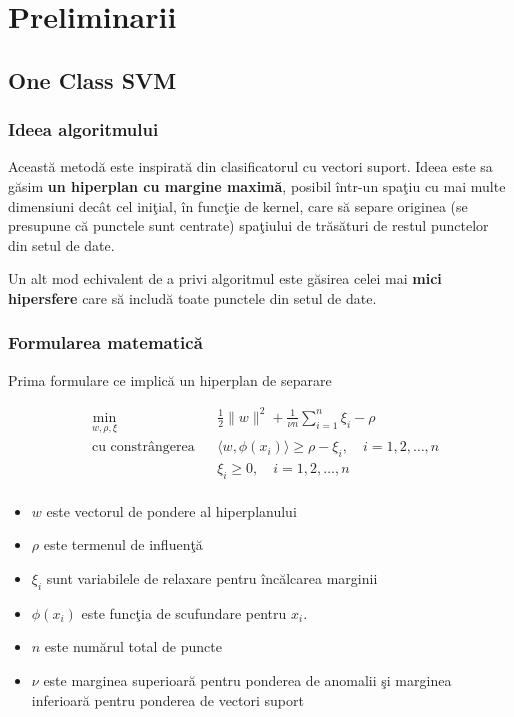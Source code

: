 \chapter{Preliminarii}

\section{One Class SVM}

\subsection{Ideea algoritmului}

Această metodă este inspirată din clasificatorul cu vectori suport. Ideea este 
sa găsim \textbf{un hiperplan cu margine maximă}, posibil într-un spaţiu cu 
mai multe dimensiuni decât cel iniţial, în funcţie de kernel,
care să separe originea (se presupune că punctele sunt centrate) spaţiului de trăsături
de restul punctelor din setul de date\cite{Schölkopf et al}.

Un alt mod echivalent de a privi algoritmul este găsirea celei mai \textbf{mici 
hipersfere} care să includă toate punctele din setul de date\cite{Tax et al.}.

\subsection{Formularea matematică}

Prima formulare ce implică un hiperplan de separare

\begin{equation}
    \begin{aligned}
    & \underset{w, \rho, \xi}{\text{min}}
    & & \frac{1}{2} \|w\|^2 + \frac{1}{\nu n} \sum_{i=1}^{n} \xi_i - \rho \\
    & \text{cu constrângerea}
    & & \langle w, \phi(x_i) \rangle \geq \rho - \xi_i, \quad i=1,2,\ldots,n \\
    &&& \xi_i \geq 0, \quad i=1,2,\ldots,n \\
    \end{aligned}
    \end{equation}
    
    \begin{itemize}
        \item $w$ este vectorul de pondere al hiperplanului
        \item $\rho$ este termenul de influenţă
        \item $\xi_i$ sunt variabilele de relaxare pentru încălcarea marginii
        \item $\phi(x_i)$ este funcţia de scufundare pentru $x_i$.
        \item $n$ este numărul total de puncte
        \item $\nu$ este marginea superioară pentru ponderea de anomalii şi marginea 
        inferioară pentru ponderea de vectori suport
    
    \end{itemize}

